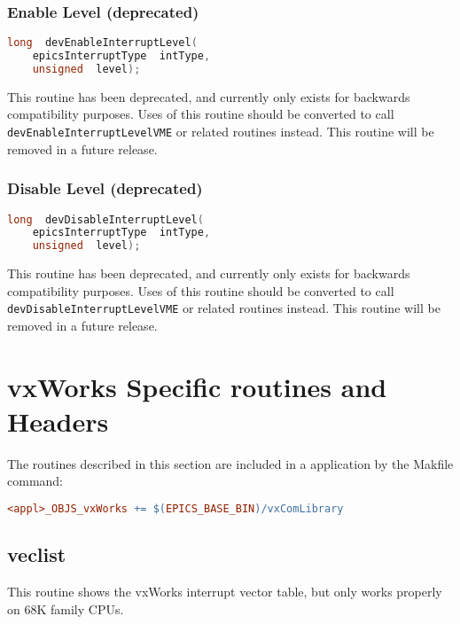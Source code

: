 \subsubsection{Enable Level (deprecated)}

\begin{lstlisting}[language=C]
long  devEnableInterruptLevel(
    epicsInterruptType  intType,
    unsigned  level);
\end{lstlisting}

This routine has been deprecated, and currently only exists for backwards compatibility purposes. Uses of this routine 
should be converted to call \verb|devEnableInterruptLevelVME| or related routines instead. This routine will be removed 
in a future release.

\subsubsection{Disable Level (deprecated)}

\begin{lstlisting}[language=C]
long  devDisableInterruptLevel(
    epicsInterruptType  intType,
    unsigned  level);
\end{lstlisting}

This routine has been deprecated, and currently only exists for backwards compatibility purposes. Uses of this routine 
should be converted to call \verb|devDisableInterruptLevelVME| or related routines instead. This routine will be 
removed in a future release.

\section{vxWorks Specific routines and Headers}

The routines described in this section are included in a application by the Makfile command:

\begin{lstlisting}[language=make]
<appl>_OBJS_vxWorks += $(EPICS_BASE_BIN)/vxComLibrary
\end{lstlisting}

\subsection{veclist}

This routine shows the vxWorks interrupt vector table, but only works properly on 68K family CPUs.

